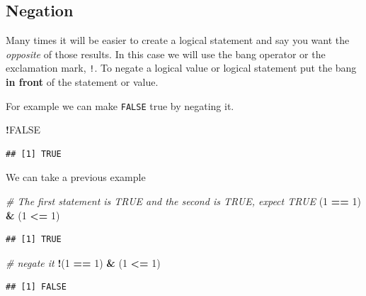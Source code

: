 \documentclass[
]{book}
\newenvironment{Shaded}{\begin{snugshade}}{\end{snugshade}}
\newcommand{\CommentTok}[1]{\textcolor[rgb]{0.56,0.35,0.01}{\textit{#1}}}
\newcommand{\DecValTok}[1]{\textcolor[rgb]{0.00,0.00,0.81}{#1}}
\newcommand{\NormalTok}[1]{#1}
\newcommand{\OperatorTok}[1]{\textcolor[rgb]{0.81,0.36,0.00}{\textbf{#1}}}
\newcommand{\OtherTok}[1]{\textcolor[rgb]{0.56,0.35,0.01}{#1}}
\newcommand{\StringTok}[1]{\textcolor[rgb]{0.31,0.60,0.02}{#1}}
\begin{document}
\hypertarget{negation}{%
\subsection{Negation}\label{negation}}

Many times it will be easier to create a logical statement and say you want the \emph{opposite} of those results. In this case we will use the bang operator or the exclamation mark, \texttt{!}. To negate a logical value or logical statement put the bang \textbf{in front} of the statement or value.

For example we can make \texttt{FALSE} true by negating it.

\begin{Shaded}
\begin{Highlighting}[]
\OperatorTok{!}\OtherTok{FALSE}
\end{Highlighting}
\end{Shaded}

\begin{verbatim}
## [1] TRUE
\end{verbatim}

We can take a previous example

\begin{Shaded}
\begin{Highlighting}[]
\CommentTok{\# The first statement is TRUE and the second is TRUE, expect TRUE}
\NormalTok{(}\DecValTok{1} \OperatorTok{==}\StringTok{ }\DecValTok{1}\NormalTok{) }\OperatorTok{\&}\StringTok{ }\NormalTok{(}\DecValTok{1} \OperatorTok{\textless{}=}\StringTok{ }\DecValTok{1}\NormalTok{)}
\end{Highlighting}
\end{Shaded}

\begin{verbatim}
## [1] TRUE
\end{verbatim}

\begin{Shaded}
\begin{Highlighting}[]
\CommentTok{\# negate it}
\OperatorTok{!}\NormalTok{(}\DecValTok{1} \OperatorTok{==}\StringTok{ }\DecValTok{1}\NormalTok{) }\OperatorTok{\&}\StringTok{ }\NormalTok{(}\DecValTok{1} \OperatorTok{\textless{}=}\StringTok{ }\DecValTok{1}\NormalTok{)}
\end{Highlighting}
\end{Shaded}

\begin{verbatim}
## [1] FALSE
\end{verbatim}
\end{document}
